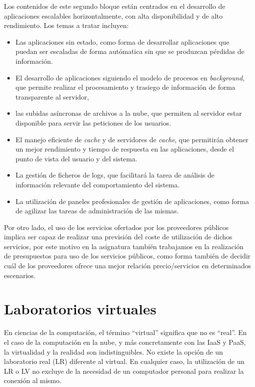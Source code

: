 \documentclass[conference]{IEEEtran}
\begin{document}
Los contenidos de este segundo bloque están centrados en el desarrollo de aplicaciones 
escalables horizontalmente, con alta disponibilidad y de alto rendimiento.
Los temas a tratar incluyen:
\begin{itemize}
\item Las aplicaciones sin estado, como forma de desarrollar aplicaciones que puedan ser
escaladas de forma autómatica sin que se produzcan pérdidas de información.
\item El desarrollo de aplicaciones siguiendo el modelo de procesos en \textit{background}, que permite
realizar el procesamiento y trasiego de información de forma transparente al servidor,
\item las subidas asíncronas de archivos a la nube, que permiten al servidor estar disponible para
servir las peticiones de los usuarios.
\item El manejo eficiente de \textit{cache} y  de servidores de \textit{cache}, que permitirán
obtener un mejor rendimiento y tiempo de respuesta en las aplicaciones, desde el punto de vista del
usuario y del sistema.
\item La gestión de ficheros de logs, que facilitará la tarea de análisis de información relevante
del comportamiento del sistema.
\item La utilización de paneles profesionales de gestión de aplicaciones, como forma de agilizar las
tareas de administración de las mismas.
\end{itemize}
 

Por otro lado, el uso de los servicios ofertados por los proveedores públicos implica ser capaz de 
realizar una previsión del coste de utilización de dichos servicios, por este motivo en la asignatura también 
trabajamos en la realización de presupuestos para uso de los servicios públicos, como forma
también de decidir cuál de los proveedores ofrece una mejor relación precio/servicios en determinados 
escenarios.



\section{Laboratorios virtuales \label{sec:laboratorios_virtuales}}

En ciencias de la computación, el término ``virtual'' significa que no es ``real''.
En el caso de la computación en la nube, y más concretamente con las IaaS y PaaS, la virtualidad y la realidad son indistinguibles.
No existe la opción de un laboratorio real (LR) diferente al virtual. En cualquier caso, la utilización de un LR o LV no 
excluye de la necesidad de un computador personal para realizar la conexión al mismo.
\end{document}
